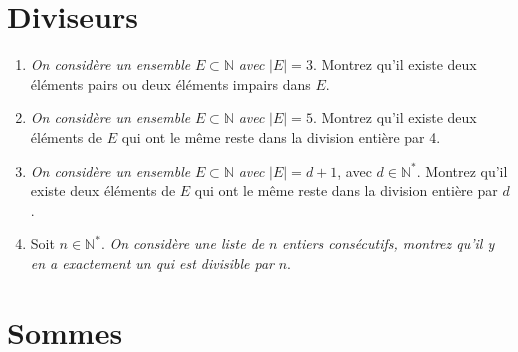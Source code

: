 \documentclass[a4paper,11pt]{article}
\begin{document}
\section{Diviseurs}

\begin{enumerate}
\item \emph{On considère un ensemble} $E \subset \mathbb{N}$ \emph{avec} $|E| = 3$. Montrez qu'il existe deux éléments pairs ou deux éléments impairs dans $E$.

\item \emph{On considère un ensemble} $E \subset \mathbb{N}$ \emph{avec} $|E| = 5$. Montrez qu'il existe deux éléments de $E$ qui ont le même reste dans la division entière par 4.

\item \emph{On considère un ensemble} $E \subset \mathbb{N}$ \emph{avec} $|E| = d + 1$, avec $d \in \mathbb{N}^*$. Montrez qu'il existe deux éléments de $E$ qui ont le même reste dans la division entière par $d$.

\item Soit $n \in \mathbb{N}^*$. \emph{On considère une liste de} $n$ \emph{entiers consécutifs, montrez qu'il y en a exactement un qui est divisible par} $n$.
\end{enumerate}

\section{Sommes}
\end{document}
